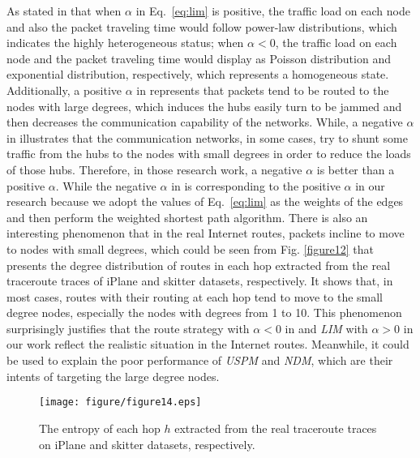 \documentclass[a4paper]{llncs}
\begin{document}
As stated in
\cite{TrafficDynamicLocal,EfficientRouting}
that when $\alpha$ in Eq.~\ref{eq:lim} is positive, the traffic
load on each node and also the packet traveling time would follow power-law
distributions, which indicates the highly heterogeneous status; when
$\alpha < 0$, the traffic load on each node and the packet traveling
time would display as Poisson distribution and exponential
distribution, respectively, which represents a homogeneous state.
Additionally, a positive $\alpha$ in \cite{TrafficDynamicLocal,EfficientRouting} represents that packets tend to be routed
to the nodes with large degrees, which induces the hubs easily turn
to be jammed and then decreases the communication capability of the
networks. While, a negative $\alpha$ in \cite{TrafficDynamicLocal,EfficientRouting} illustrates that the
communication networks, in some cases, try to shunt some traffic
from the hubs to the nodes with small degrees in order to reduce the
loads of those hubs. Therefore, in those research work, a negative $\alpha$ is better than a
positive $\alpha$. While the negative $\alpha$ in \cite{TrafficDynamicLocal,EfficientRouting} is corresponding to the positive $\alpha$ in our research because we adopt the values of Eq.~\ref{eq:lim}
as the weights of the edges and then perform the weighted shortest
path algorithm. There is also an interesting phenomenon that
in the real Internet routes, packets incline to move to nodes
with small degrees, which could be seen from Fig. \ref{figure12}
that presents the degree distribution of routes in each hop
extracted from the real traceroute traces of iPlane and skitter
datasets, respectively. It shows that, in most cases, routes with their routing at each hop tend to move
to the small degree nodes, especially the nodes with degrees from 1 to 10.
This phenomenon surprisingly justifies that the route strategy with $\alpha
< 0$ in \cite{TrafficDynamicLocal,EfficientRouting}
and \textit{LIM} with $\alpha > 0$ in our work reflect the realistic
situation in the Internet routes. Meanwhile, it could be used to
explain the poor performance of \textit{USPM} and \textit{NDM}, which are
their intents of targeting the large degree nodes.


\begin{figure}[!t]
\centering
\texttt{[image: figure/figure14.eps]}
\vspace{-1.7em}
\caption{The entropy of each hop $h$ extracted from the real traceroute traces on iPlane and skitter datasets, respectively.}
\label{figure14}
\vspace{-0.5em}
\end{figure}
\end{document}
